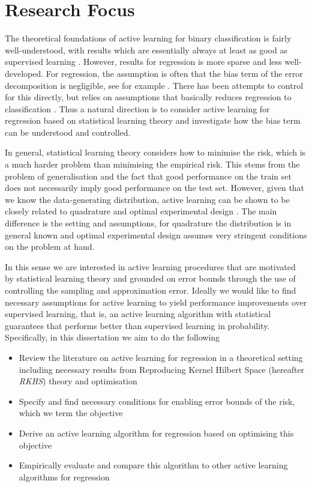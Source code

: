 \section{Research Focus}
The theoretical foundations of active learning for binary classification is
fairly well-understood, with results which are essentially always at least as
good as supervised learning \cite{balcan10_true_sampl_compl_activ_learn}. However,
results for regression is more sparse and less well-developed. For regression,
the assumption is often that the bias term of the error decomposition is
negligible, see for example \cite{cohn96_activ_learn_with_statis_model}. There has
been attempts to control for this directly, but relies on assumptions that
basically reduces regression to classification
\cite{willett06_faster_rates_regres_activ_learn}. Thus a natural direction is to
consider active learning for regression based on statistical learning theory and
investigate how the bias term can be understood and controlled.

In general, statistical learning theory considers how to minimise the risk,
which is a much harder problem than minimising the empirical risk. This stems
from the problem of generalisation and the fact that good performance on the
train set does not necessarily imply good performance on the test set. However,
given that we know the data-generating distribution, active learning can be
shown to be closely related to quadrature \cite{briol15_frank_wolfe_bayes} and
optimal experimental design \cite{fedorov10_optim_exper_desig}. The main
difference is the setting and assumptions, for quadrature the distribution is in
general known and optimal experimental design assumes very
stringent conditions on the problem at hand.

In this sense we are interested in active learning procedures that are motivated
by statistical learning theory and grounded on error bounds through the use of
controlling the sampling and approximation error. Ideally we would like to find
necessary assumptions for active learning to yield performance improvements over
supervised learning, that is, an active learning algorithm with statistical
guarantees that performs better than supervised learning in probability.
Specifically, in this dissertation we aim to do the following 

\begin{itemize}
\item Review the literature on active learning for regression in a theoretical
  setting including necessary results from Reproducing Kernel Hilbert Space
  (hereafter \emph{RKHS}) theory and optimisation
\item Specify and find necessary conditions for enabling error bounds of the risk,
  which we term the objective
\item Derive an active learning algorithm for regression based on optimising this objective
\item Empirically evaluate and compare this algorithm to other active learning
  algorithms for regression
\end{itemize}

